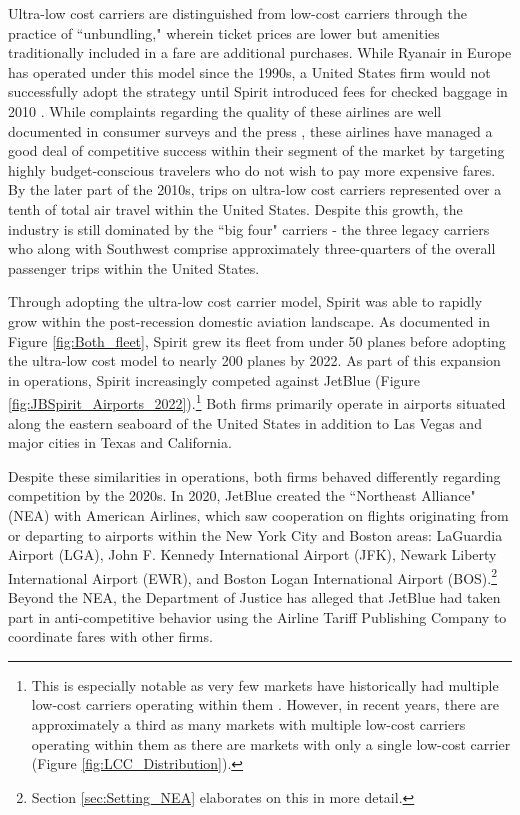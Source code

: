 \documentclass{article}
\begin{document}
	Ultra-low cost carriers are distinguished from low-cost carriers through the practice of ``unbundling," wherein ticket prices are lower but amenities traditionally included in a fare are additional purchases. While Ryanair in Europe has operated under this model since the 1990s, a United States firm would not successfully adopt the strategy until Spirit introduced fees for checked baggage in 2010 \citep{bachwich_emergence_2017}. While complaints regarding the quality of these airlines are well documented in consumer surveys and the press \citep{vasel_spirit_2016, elliott_jetblue_2022}, these airlines have managed a good deal of competitive success within their segment of the market by targeting highly budget-conscious travelers who do not wish to pay more expensive fares. By the later part of the 2010s, trips on ultra-low cost carriers represented over a tenth of total air travel within the United States.  Despite this growth, the industry is still dominated by the ``big four" carriers - the three legacy carriers who along with Southwest comprise approximately three-quarters of the overall passenger trips within the United States. 

     Through adopting the ultra-low cost carrier model, Spirit was able to rapidly grow within the post-recession domestic aviation landscape. As documented in Figure \ref{fig:Both_fleet}, Spirit grew its fleet from under 50 planes before adopting the ultra-low cost model to nearly 200 planes by 2022. As part of this expansion in operations, Spirit increasingly competed against JetBlue (Figure \ref{fig:JBSpirit_Airports_2022}).\footnote{This is especially notable as very few markets have historically had multiple low-cost carriers operating within them \citep{kwoka_fringe_2016, ciliberto_market_2021}. However, in recent years, there are approximately a third as many markets with multiple low-cost carriers operating within them as there are markets with only a single low-cost carrier (Figure \ref{fig:LCC_Distribution}).} Both firms primarily operate in airports situated along the eastern seaboard of the United States in addition to Las Vegas and major cities in Texas and California.
	
	Despite these similarities in operations, both firms behaved differently regarding competition by the 2020s.  In 2020, JetBlue created the ``Northeast Alliance" (NEA) with American Airlines, which saw cooperation on flights originating from or departing to airports within the New York City and Boston areas: LaGuardia Airport (LGA), John F. Kennedy International Airport (JFK), Newark Liberty International Airport (EWR), and Boston Logan International Airport (BOS).\footnote{Section \ref{sec:Setting_NEA} elaborates on this in more detail.} Beyond the NEA, the Department of Justice has alleged that JetBlue had taken part in anti-competitive behavior using the Airline Tariff Publishing Company to coordinate fares with other firms. 
	
\end{document}
